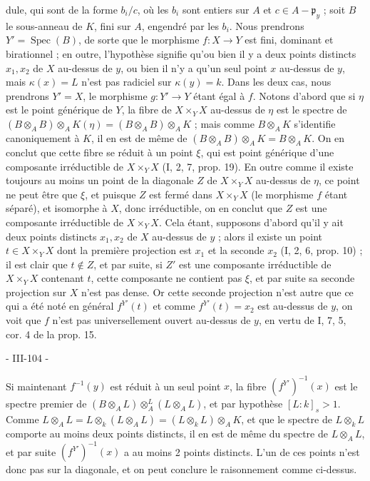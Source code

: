 dule, qui sont de la forme $b_i/c$, où les $b_i$ sont entiers sur $A$ et $c \in A - \mathfrak{p}_y$ ; soit $B$ le sous-anneau de $K$, fini sur $A$, engendré par les $b_i$. Nous prendrons $Y' = \operatorname{Spec}(B)$, de sorte que le morphisme $f : X \to Y$ est fini, dominant et birationnel ; en outre, l'hypothèse signifie qu'ou bien il y a deux points distincts $x_1, x_2$ de $X$ au-dessus de $y$, ou bien il n'y a qu'un seul point $x$ au-dessus de $y$, mais $\kappa(x) = L$ n'est pas radiciel sur $\kappa(y) = k$. Dans les deux cas, nous prendrons $Y' = X$, le morphisme $g : Y' \to Y$ étant égal à $f$. Notons d'abord que si $\eta$ est le point générique de $Y$, la fibre de $X \times_Y X$ au-dessus de $\eta$ est le spectre de $(B \otimes_A B) \otimes_A K( \eta) = (B \otimes_A B) \otimes_A K$ ; mais comme $B \otimes_A K$ s'identifie canoniquement à $K$, il en est de même de $(B \otimes_A B) \otimes_A K = B \otimes_A K$. On en conclut que cette fibre se réduit à un point $\xi$, qui est point générique d'une composante irréductible de $X \times_Y X$ (I, 2, 7, prop. 19). En outre comme il existe toujours au moins un point de la diagonale $Z$ de $X \times_Y X$ au-dessus de $\eta$, ce point ne peut être que $\xi$, et puisque $Z$ est fermé dans $X \times_Y X$ (le morphisme $f$ étant séparé), et isomorphe à $X$, donc irréductible, on en conclut que $Z$ est une composante irréductible de $X \times_Y X$. Cela étant, supposons d'abord qu'il y ait deux points distincts $x_1, x_2$ de $X$ au-dessus de $y$ ; alors il existe un point $t \in X \times_Y X$ dont la première projection est $x_1$ et la seconde $x_2$ (I, 2, 6, prop. 10) ; il est clair que $t \notin Z$, et par suite, si $Z'$ est une composante irréductible de $X \times_Y X$ contenant $t$, cette composante ne contient pas $\xi$, et par suite sa seconde projection sur $X$ n'est pas dense. Or cette seconde projection n'est autre que ce qui a été noté en général $f^{Y'}(t)$ et comme $f^{Y'}(t) = x_2$ est au-dessus de $y$, on voit que $f$ n'est pas universellement ouvert au-dessus de $y$, en vertu de I, 7, 5, cor. 4 de la prop. 15.

\newpage


- III-104 -

Si maintenant $f^{-1}(y)$ est réduit à un seul point $x$, la fibre $(f^{Y'})^{-1}(x)$ est le spectre premier de $(B \otimes_A L) \otimes_A^L (L \otimes_A L)$, et par hypothèse $[L:k]_s > 1$. Comme $L \otimes_A L = L \otimes_k (L \otimes_A L) = (L \otimes_k L) \otimes_A K$, et que le spectre de $L \otimes_k L$ comporte au moins deux points distincts, il en est de même du spectre de $L \otimes_A L$, et par suite $(f^{Y'})^{-1}(x)$ a au moins 2 points distincts. L'un de ces points n'est donc pas sur la diagonale, et on peut conclure le raisonnement comme ci-dessus.

